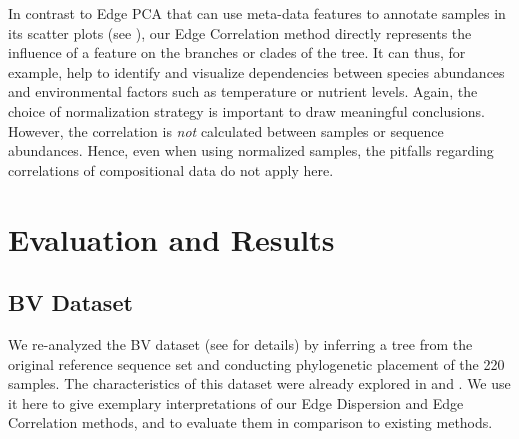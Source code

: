 In contrast to Edge PCA \cite{Matsen2011a} that can use meta-data features to annotate samples in its scatter plots
(see ),
our Edge Correlation method directly represents the influence of a feature on the branches or clades of the tree.
It can thus, for example, help to identify and visualize dependencies
between species abundances and environmental factors such as temperature or nutrient levels.
Again, the choice of normalization strategy is important to draw meaningful conclusions.
However, the correlation is \emph{not} calculated between samples or sequence abundances.
Hence, even when using normalized samples, %
the pitfalls regarding correlations of compositional data \cite{Lovell2015} do not apply here.



\section{Evaluation and Results}
\label{ch:Visualization:sec:Results}


\subsection{BV Dataset}
\label{ch:Visualization:sec:Results:sub:BVDataset}

We re-analyzed the \acf{BV} dataset (see  for details)
by inferring a tree from the original reference sequence set
and conducting phylogenetic placement of the \num{220} samples.
The characteristics of this dataset were already explored in \cite{Srinivasan2012} and \cite{Matsen2011a}.
We use it here to give exemplary interpretations of our Edge Dispersion and Edge Correlation methods,
and to evaluate them in comparison to existing methods.

